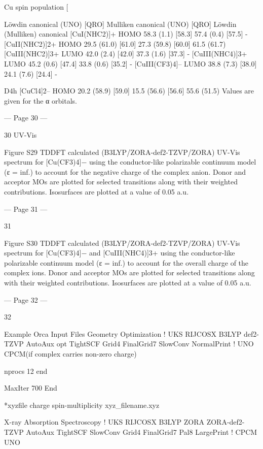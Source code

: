 Cu spin population [%
 
Löwdin  
canonical (UNO) [QRO] 
Mulliken  
canonical (UNO) [QRO] 
Löwdin (Mulliken) 
canonical 
[CuI(NHC2)]+  
HOMO 
58.3 (1.1) [58.3] 
57.4 (0.4) [57.5] 
- 
[CuII(NHC2)]2+  
HOMO 
29.5 (61.0) [61.0] 
27.3 (59.8) [60.0] 
61.5 (61.7) 
[CuIII(NHC2)]3+  
LUMO 
42.0 (2.4) [42.0] 
37.3 (1.6) [37.3] 
- 
[CuIII(NHC4)]3+ 
LUMO 
45.2 (0.6) [47.4] 
33.8 (0.6) [35.2] 
- 
[CuIII(CF3)4]– 
LUMO 
38.8 (7.3) [38.0] 
24.1 (7.6) [24.4] 
- 
 
D4h [CuCl4]2–  
HOMO 
20.2 (58.9) [59.0] 
15.5 (56.6) [56.6] 
55.6 (51.5) 
Values are given for the α orbitals.  
 


--- Page 30 ---
 
30 
UV-Vis  
 
Figure S29 TDDFT calculated (B3LYP/ZORA-def2-TZVP/ZORA) UV-Vis spectrum for [Cu(CF3)4]− using the 
conductor-like polarizable continuum model (ε = inf.) to account for the negative charge of the complex anion. 
Donor and acceptor MOs are plotted for selected transitions along with their weighted contributions. Isosurfaces 
are plotted at a value of 0.05 a.u. 
 


--- Page 31 ---
 
31 
 
Figure S30 TDDFT calculated (B3LYP/ZORA-def2-TZVP/ZORA) UV-Vis spectrum for [Cu(CF3)4]− and 
[CuIII(NHC4)]3+ using the conductor-like polarizable continuum model (ε = inf.) to account for the overall charge of 
the complex ions. Donor and acceptor MOs are plotted for selected transitions along with their weighted 
contributions. Isosurfaces are plotted at a value of 0.05 a.u. 
 
 
 


--- Page 32 ---
 
32 
 
Example Orca Input Files 
Geometry Optimization 
! UKS RIJCOSX B3LYP def2-TZVP AutoAux opt TightSCF Grid4 FinalGrid7 SlowConv NormalPrint  
! UNO CPCM(if complex carries non-zero charge)  
 
nprocs 12 
end 
 
 
MaxIter 700 
End 
 
*xyzfile charge spin-multiplicity xyz_filename.xyz 
 
 
X-ray Absorption Spectroscopy 
! UKS RIJCOSX B3LYP ZORA ZORA-def2-TZVP AutoAux TightSCF SlowConv Grid4 FinalGrid7 Pal8 LargePrint 
! CPCM UNO 
  
